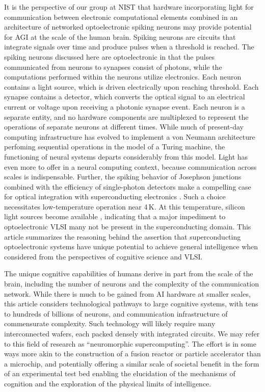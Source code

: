\documentclass[twocolumn]{article}
\begin{document}
It is the perspective of our group at NIST that hardware incorporating light for communication between electronic computational elements combined in an architecture of networked optoelectronic spiking neurons may provide potential for AGI at the scale of the human brain. Spiking neurons are circuits that integrate signals over time and produce pulses when a threshold is reached. The spiking neurons discussed here are optoelectronic in that the pulses communicated from neurons to synapses consist of photons, while the computations performed within the neurons utilize electronics. Each neuron contains a light source, which is driven electrically upon reaching threshold. Each synapse contains a detector, which converts the optical signal to an electrical current or voltage upon receiving a photonic synapse event. Each neuron is a separate entity, and no hardware components are multiplexed to represent the operations of separate neurons at different times. While much of present-day computing infrastructure has evolved to implement a von Neumann architecture perfoming sequential operations in the model of a Turing machine, the functioning of neural systems departs considerably from this model. Light has even more to offer in a neural computing context, because communication across scales is indispensable. Further, the spiking behavior of Josephson junctions combined with the efficiency of single-photon detectors make a compelling case for optical integration with superconducting electronics \cite{shbu2017,sh2018}. Such a choice necessitates low-temperature operation near 4\,K. At this temperature, silicon light sources become available \cite{buch2017}, indicating that a major impediment to optoelectronic VLSI many not be present in the superconducting domain. This article summarizes the reasoning behind the assertion that superconducting optoelectronic systems have unique potential to achieve general intelligence when considered from the perspectives of cognitive science and VLSI.

The unique cognitive capabilities of humans derive in part from the scale of the brain, including the number of neurons and the complexity of the communication network. While there is much to be gained from AI hardware at smaller scales, this article considers technological pathways to large cognitive systems, with tens to hundreds of billions of neurons, and communication infrastructure of commensurate complexity. Such technology will likely require many interconnected wafers, each packed densely with integrated circuits. We may refer to this field of research as ``neuromorphic supercomputing''. The effort is in some ways more akin to the construction of a fusion reactor or particle accelerator than a microchip, and potentially offering a similar scale of societal benefit in the form of an experimental test bed enabling the elucidation of the mechanisms of cognition and the exploration of the physical limits of intelligence.
\end{document}
